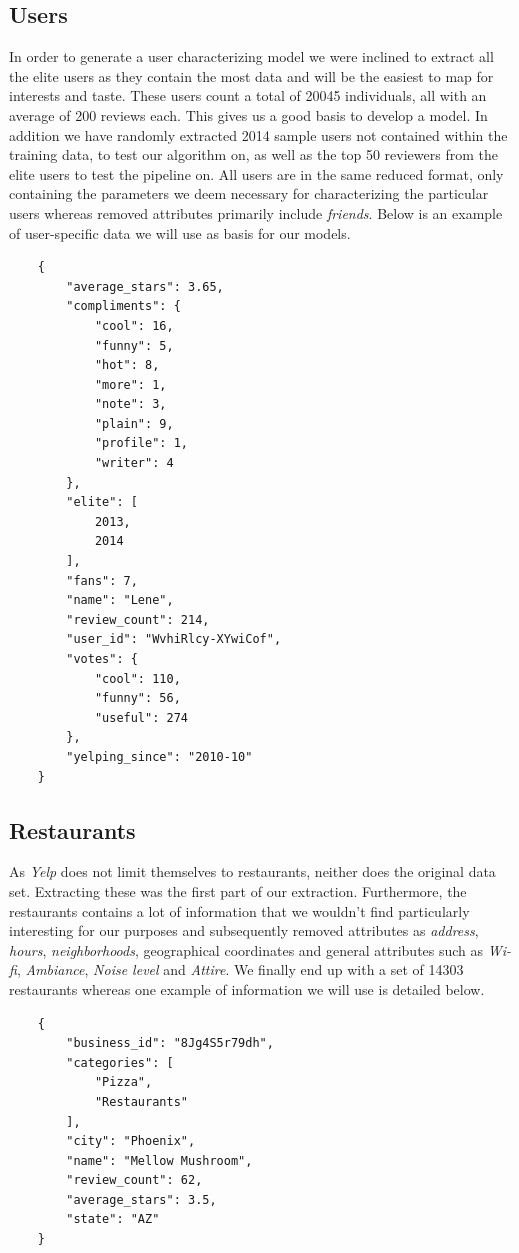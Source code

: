 \documentclass[10pt,twocolumn,letterpaper]{article}
\begin{document}
\subsection{Users}
In order to generate a user characterizing model we were inclined to extract all the elite users as they contain the most data and will be the easiest to map for interests and taste. These users count a total of 20045 individuals, all with an average of 200 reviews each. This gives us a good basis to develop a model. In addition we have randomly extracted 2014 sample users not contained within the training data, to test our algorithm on, as well as the top 50 reviewers from the elite users to test the pipeline on. All users are in the same reduced format, only containing the parameters we deem necessary for characterizing the particular users whereas removed attributes primarily include \textit{friends}. Below is an example of user-specific data we will use as basis for our models.

\begin{verbatim}
	{
        "average_stars": 3.65,
        "compliments": {
            "cool": 16,
            "funny": 5,
            "hot": 8,
            "more": 1,
            "note": 3,
            "plain": 9,
            "profile": 1,
            "writer": 4
        },
        "elite": [
            2013,
            2014
        ],
        "fans": 7,
        "name": "Lene",
        "review_count": 214,
        "user_id": "WvhiRlcy-XYwiCof",
        "votes": {
            "cool": 110,
            "funny": 56,
            "useful": 274
        },
        "yelping_since": "2010-10"
    }
\end{verbatim}

\subsection{Restaurants}
As \textit{Yelp} does not limit themselves to restaurants, neither does the original data set. Extracting these was the first part of our extraction. Furthermore, the restaurants contains a lot of information that we wouldn't find particularly interesting for our purposes and subsequently removed attributes as \textit{address}, \textit{hours}, \textit{neighborhoods}, geographical coordinates and general attributes such as \textit{Wi-fi}, \textit{Ambiance}, \textit{Noise level} and \textit{Attire}. We finally end up with a set of 14303 restaurants whereas one example of information we will use is detailed below.

\begin{verbatim}
	{
	    "business_id": "8Jg4S5r79dh",
	    "categories": [
	        "Pizza",
	        "Restaurants"
	    ],
	    "city": "Phoenix",
	    "name": "Mellow Mushroom",
	    "review_count": 62,
	    "average_stars": 3.5,
	    "state": "AZ"
	}
\end{verbatim}
\end{document}
